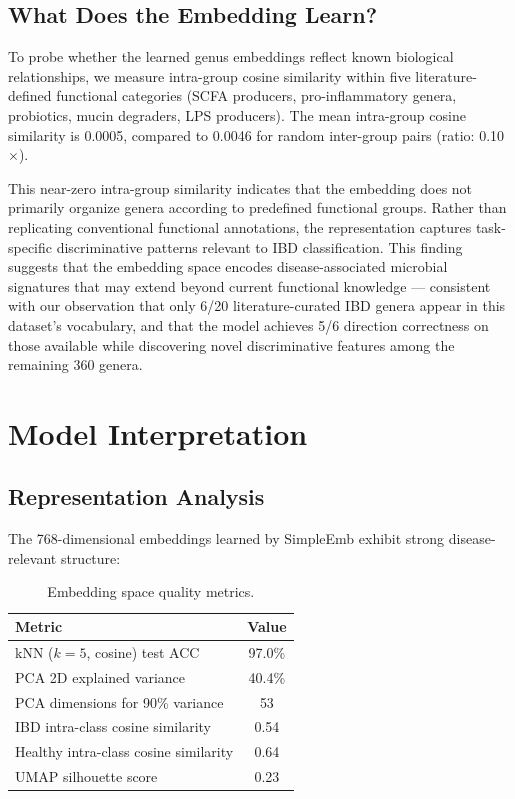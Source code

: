 \documentclass[11pt,a4paper]{article}
\begin{document}
\subsection{What Does the Embedding Learn?}

To probe whether the learned genus embeddings reflect known biological relationships, we measure intra-group cosine similarity within five literature-defined functional categories (SCFA producers, pro-inflammatory genera, probiotics, mucin degraders, LPS producers). The mean intra-group cosine similarity is 0.0005, compared to 0.0046 for random inter-group pairs (ratio: 0.10$\times$).

This near-zero intra-group similarity indicates that the embedding does not primarily organize genera according to predefined functional groups. Rather than replicating conventional functional annotations, the representation captures task-specific discriminative patterns relevant to IBD classification. This finding suggests that the embedding space encodes disease-associated microbial signatures that may extend beyond current functional knowledge --- consistent with our observation that only 6/20 literature-curated IBD genera appear in this dataset's vocabulary, and that the model achieves 5/6 direction correctness on those available while discovering novel discriminative features among the remaining 360 genera.

\section{Model Interpretation}

\subsection{Representation Analysis}

The 768-dimensional embeddings learned by SimpleEmb exhibit strong disease-relevant structure:

\begin{table}[ht]
\centering
\caption{Embedding space quality metrics.}
\label{tab:repr}
\begin{tabular}{lc}
\toprule
\textbf{Metric} & \textbf{Value} \\
\midrule
kNN ($k{=}5$, cosine) test ACC & 97.0\% \\
PCA 2D explained variance & 40.4\% \\
PCA dimensions for 90\% variance & 53 \\
IBD intra-class cosine similarity & 0.54 \\
Healthy intra-class cosine similarity & 0.64 \\
UMAP silhouette score & 0.23 \\
\bottomrule
\end{tabular}
\end{table}
\end{document}
